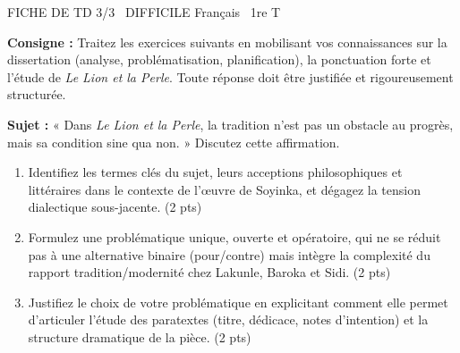\documentclass[11pt]{article}
\begin{document}
\begin{tcolorbox}[enhanced,colback=popink,colframe=popink,arc=10pt,boxrule=0pt,left=12pt,right=12pt,top=9pt,bottom=9pt]
{\color{white}\popxbold\small FICHE DE TD 3/3 \textbullet\ DIFFICILE \hfill Français \textbullet\ 1re T\par}
\end{tcolorbox}
\vspace{4pt}
\noindent \textbf{Consigne :} Traitez les exercices suivants en mobilisant vos connaissances sur la dissertation (analyse, problématisation, planification), la ponctuation forte et l'étude de \textit{Le Lion et la Perle}. Toute réponse doit être justifiée et rigoureusement structurée.

\begin{exercice}
\textbf{Sujet :} « Dans \textit{Le Lion et la Perle}, la tradition n'est pas un obstacle au progrès, mais sa condition sine qua non. » Discutez cette affirmation.

\begin{enumerate}
    \item Identifiez les termes clés du sujet, leurs acceptions philosophiques et littéraires dans le contexte de l'œuvre de Soyinka, et dégagez la tension dialectique sous-jacente. (2 pts)
    \item Formulez une problématique unique, ouverte et opératoire, qui ne se réduit pas à une alternative binaire (pour/contre) mais intègre la complexité du rapport tradition/modernité chez Lakunle, Baroka et Sidi. (2 pts)
    \item Justifiez le choix de votre problématique en explicitant comment elle permet d'articuler l'étude des paratextes (titre, dédicace, notes d'intention) et la structure dramatique de la pièce. (2 pts)
\end{enumerate}
\end{exercice}
\end{document}
